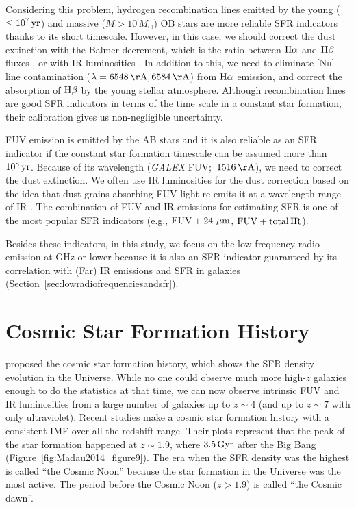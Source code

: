 Considering this problem, hydrogen recombination lines emitted by the young ($\leq 10^7\,\mathrm{yr}$) and massive ($M > 10\,M_{\odot}$) OB stars are more reliable SFR indicators thanks to its short timescale.
However, in this case, we should correct the dust extinction with the Balmer decrement, which is the ratio between $\mathrm{H\alpha}$ and $\mathrm{H\beta}$ fluxes \citep{Lequeux1981}, or with IR luminosities \citep{Kennicutt2009}.
In addition to this, we need to eliminate [N\textsc{ii}] line contamination ($\lambda = 6548\,\mr{\AA}, 6584\,\mr{\AA}$) from $\mathrm{H}\alpha$ emission, and correct the absorption of $\mathrm{H\beta}$ by the young stellar atmosphere.
Although recombination lines are good SFR indicators in terms of the time scale in a constant star formation, their calibration gives us non-negligible uncertainty.

FUV emission is emitted by the AB stars and it is also reliable as an SFR indicator if the constant star formation timescale can be assumed more than $10^8\,\mathrm{yr}$.
Because of its wavelength ({\it GALEX\/} FUV;~$1516\,\mr{\AA}$), we need to correct the dust extinction.
We often use IR luminosities for the dust correction based on the idea that dust grains absorbing FUV light re-emits it at a wavelength range of IR \citep{Kennicutt1998, Murphy2011}.
The combination of FUV and IR emissions for estimating SFR is one of the most popular SFR indicators (e.g., $\mathrm{FUV + 24\,\,\mathrm{\mu m}}$, $\mathrm{FUV + total\,IR}$).

Besides these indicators, in this study, we focus on the low-frequency radio emission at GHz or lower because it is also an SFR indicator guaranteed by its correlation with (Far) IR emissions and SFR in galaxies (Section~\ref{sec:lowradiofrequenciesandsfr}).





\section{Cosmic Star Formation History}\label{sec:cosmicstarformationhistory}

\citet{Tinsley1980} proposed the cosmic star formation history, which shows the SFR density evolution in the Universe.
While no one could observe much more high-$z$ galaxies enough to do the statistics at that time, we can now observe intrinsic FUV and IR luminosities from a large number of galaxies up to $z \sim 4$ (and up to $z \sim 7$ with only ultraviolet).
    Recent studies \citep{Hopkins2006, Madau2014} make a cosmic star formation history with a consistent IMF over all the redshift range.
Their plots represent that the peak of the star formation happened at $z\sim1.9$, where $3.5\,\mathrm{Gyr}$ after the Big Bang (Figure~\ref{fig:Madau2014_figure9}).
The era when the SFR density was the highest is called ``the Cosmic Noon'' because the star formation in the Universe was the most active.
The period before the Cosmic Noon ($z > 1.9$) is called  ``the Cosmic dawn''.


